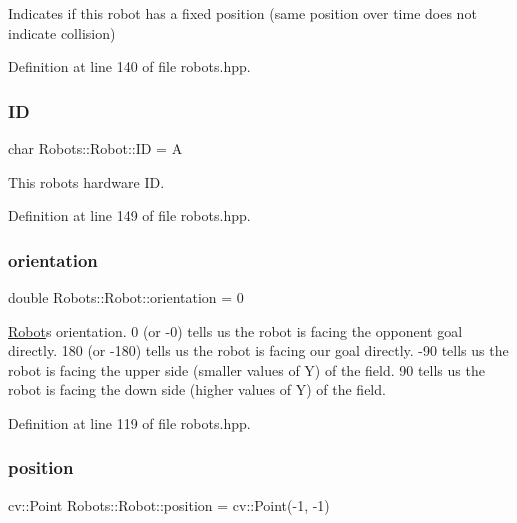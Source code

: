 Indicates if this robot has a fixed position (same position over time does not indicate collision) 



Definition at line 140 of file robots.\+hpp.

\mbox{\label{struct_robots_1_1_robot_a3ce196fc3922dc0d256273d33f29da50}} 
\subsubsection{\texorpdfstring{ID}{ID}}
{\footnotesize\ttfamily char Robots\+::\+Robot\+::\+ID = \textquotesingle{}A\textquotesingle{}}



This robot\textquotesingle{}s hardware ID. 



Definition at line 149 of file robots.\+hpp.

\mbox{\label{struct_robots_1_1_robot_aa2a6cb8cbdbbdeb8be6c6f552277b3e8}} 
\subsubsection{\texorpdfstring{orientation}{orientation}}
{\footnotesize\ttfamily double Robots\+::\+Robot\+::orientation = 0}

\hyperlink{struct_robots_1_1_robot}{Robot}\textquotesingle{}s orientation. 0 (or -\/0) tells us the robot is facing the opponent goal directly. 180 (or -\/180) tells us the robot is facing our goal directly. -\/90 tells us the robot is facing the upper side (smaller values of Y) of the field. 90 tells us the robot is facing the down side (higher values of Y) of the field. 

Definition at line 119 of file robots.\+hpp.

\mbox{\label{struct_robots_1_1_robot_a94c80cc2e1bfad2bfcc12c0e3c463e68}} 
\subsubsection{\texorpdfstring{position}{position}}
{\footnotesize\ttfamily cv\+::\+Point Robots\+::\+Robot\+::position = cv\+::\+Point(-\/1, -\/1)}

